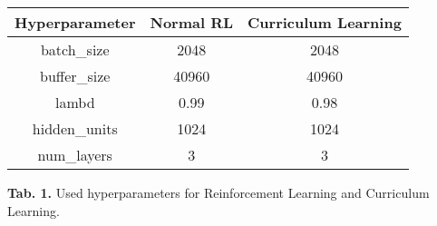 \begin{center}
    \begin{tabular}{|c|c|c|}
        \rowcolor{gray!50}
        \hline
        \textbf{Hyperparameter} & \textbf{Normal RL} & \textbf{Curriculum Learning} \\ \hline
        batch\_size    & 2048      & 2048                \\ \hline
        buffer\_size   & 40960     & 40960               \\ \hline
        lambd          & 0.99      & 0.98                \\ \hline
        hidden\_units  & 1024      & 1024                \\ \hline
        num\_layers    & 3         & 3                   \\ \hline
    \end{tabular}
\end{center}
\begin{center}
    \vspace{10pt}
    \textbf{Tab. 1.} Used hyperparameters for Reinforcement Learning and Curriculum Learning.
\end{center}

